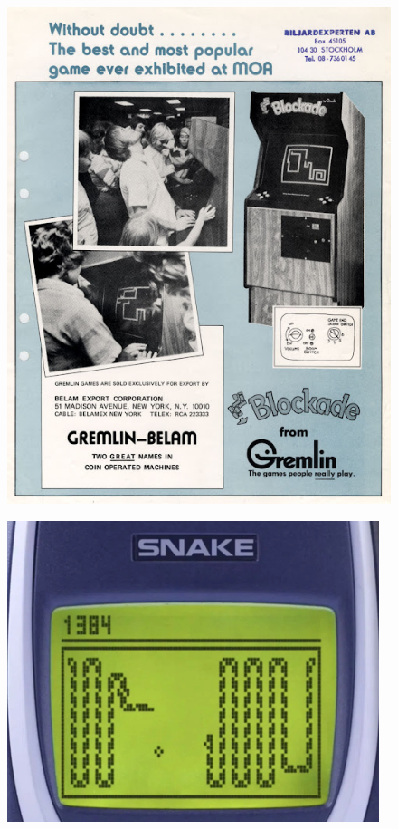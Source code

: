 \documentclass[10pt]{beamer}
\begin{document}
\begin{frame}
\begin{columns}[T]
\begin{column}{0.26\textwidth}
\begin{figure}
\includegraphics[width=1\textwidth]{blockade.jpg}
\end{figure}

\begin{figure}
\vspace{-0.4cm}
\includegraphics[width=0.97\textwidth]{snake_nokia.png}
\end{figure}


\end{column}
\end{columns}
\end{frame}
\end{document}
